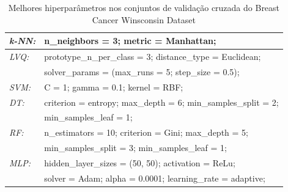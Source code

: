 \documentclass[journal]{IEEEtran}
\begin{document}
\begin{table}[h!]
	\caption{Melhores hiperparâmetros nos conjuntos de validação cruzada do Breast Cancer Winsconsin Dataset}
	\label{tab:11}
	\begin{tabular}{ l l }
		\hline
		\textit{k-NN:} & n\_neighbors = 3; metric = Manhattan;                         \\
		\hline
		\textit{LVQ:}  & prototype\_n\_per\_class = 3; distance\_type = Euclidean;     \\  & solver\_params = (max\_runs = 5; step\_size = 0.5);\\
		\hline
		\textit{SVM:}  & C = 1; gamma = 0.1; kernel = RBF;                             \\
		\hline
		\textit{DT:}   & criterion = entropy; max\_depth = 6; min\_samples\_split = 2; \\  & min\_samples\_leaf = 1;\\
		\hline
		\textit{RF:}   & n\_estimators = 10; criterion = Gini; max\_depth = 5;         \\  & min\_samples\_split = 3; min\_samples\_leaf = 1;\\
		\hline
		\textit{MLP:}  & hidden\_layer\_sizes = (50, 50); activation = ReLu;           \\  & solver = Adam; alpha = 0.0001; learning\_rate = adaptive;\\
		\hline
	\end{tabular}
\end{table}
\end{document}
